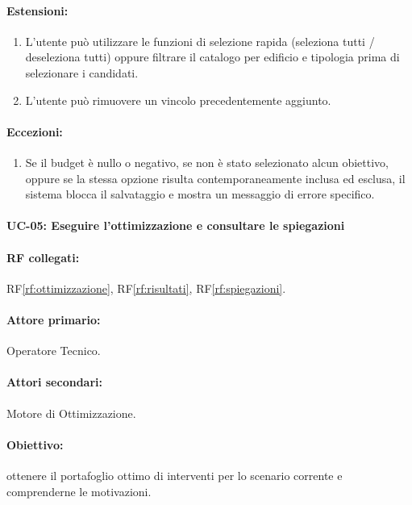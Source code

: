 \paragraph{Estensioni:}
\begin{enumerate}
    \item L'utente può utilizzare le funzioni di selezione rapida (seleziona tutti / deseleziona tutti) oppure filtrare il catalogo per edificio e tipologia prima di selezionare i candidati.
    \item L'utente può rimuovere un vincolo precedentemente aggiunto.
\end{enumerate}

\paragraph{Eccezioni:}
\begin{enumerate}
    \item Se il budget è nullo o negativo, se non è stato selezionato alcun obiettivo, oppure se la stessa opzione risulta contemporaneamente inclusa ed esclusa, il sistema blocca il salvataggio e mostra un messaggio di errore specifico.
\end{enumerate}

\paragraph{\large UC-05: Eseguire l'ottimizzazione e consultare le spiegazioni}

\paragraph{RF collegati:} RF\ref{rf:ottimizzazione}, RF\ref{rf:risultati}, RF\ref{rf:spiegazioni}.

\paragraph{Attore primario:} Operatore Tecnico.

\paragraph{Attori secondari:} Motore di Ottimizzazione.

\paragraph{Obiettivo:} ottenere il portafoglio ottimo di interventi per lo scenario corrente e comprenderne le motivazioni.

